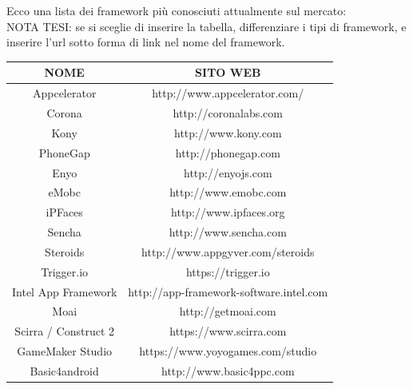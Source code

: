 Ecco una lista dei framework più conosciuti attualmente sul mercato:
\\
NOTA TESI: se si sceglie di inserire la tabella, differenziare i tipi di framework, e inserire l'url sotto forma di link nel nome del framework.
\\
\begin{table}[!htbp]
    \begin{tabular}{cc}
    \hline
    \textbf{NOME} 				 & \textbf{SITO WEB} 			                                \\\hline
    Appcelerator              	 & http://www.appcelerator.com/                                 \\\hline
    Corona                       & http://coronalabs.com                                        \\\hline
    Kony                         & http://www.kony.com                                          \\\hline
    PhoneGap                     & http://phonegap.com                                          \\\hline 
    Enyo                         & http://enyojs.com                                            \\\hline  
    eMobc                        & http://www.emobc.com                                         \\\hline
    iPFaces                      & http://www.ipfaces.org                                       \\\hline
    Sencha                       & http://www.sencha.com                                        \\\hline
    Steroids                     & http://www.appgyver.com/steroids                             \\\hline
    Trigger.io                   & https://trigger.io                                           \\\hline
    Intel App Framework          & http://app-framework-software.intel.com                      \\\hline
    Moai                         & http://getmoai.com                                           \\\hline
    Scirra / Construct 2         & https://www.scirra.com                                       \\\hline
    GameMaker Studio             & https://www.yoyogames.com/studio                             \\\hline
    Basic4android                & http://www.basic4ppc.com                                     \\\hline

\end{tabular}
\end{table}
